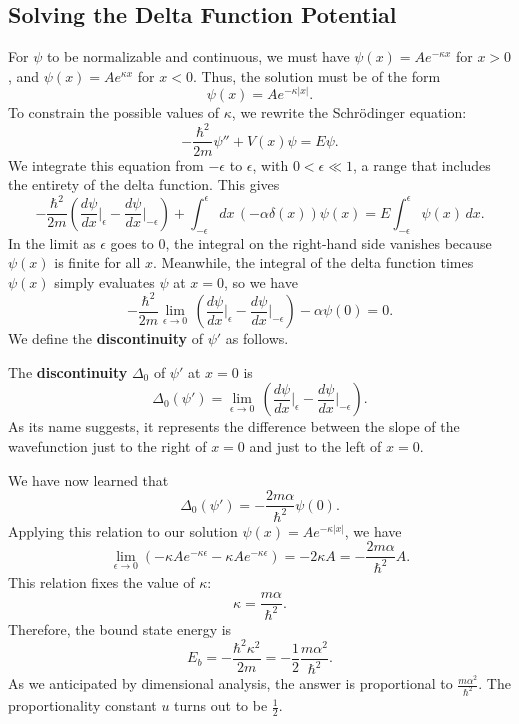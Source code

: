 \subsection{Solving the Delta Function Potential}\label{solving_the_delta_potential}

For $\psi$ to be normalizable and continuous, we must have $\psi(x)=Ae^{-\kappa x}$ for $x>0$, and $\psi(x)=Ae^{\kappa x}$ for $x<0$. Thus, the solution must be of the form $$\psi(x)=Ae^{-\kappa|x|}.$$To constrain the possible values of $\kappa$, we rewrite the Schrödinger equation: $$-\frac{\hbar^2}{2m}\psi''+V(x)\psi=E\psi.$$We integrate this equation from $-\epsilon$ to $\epsilon$, with $0<\epsilon\ll 1$, a range that includes the entirety of the delta function. This gives $$-\frac{\hbar^2}{2m}(\frac{d\psi}{dx}\bigg|_\epsilon-\frac{d\psi}{dx}\bigg|_{-\epsilon})+\int_{-\epsilon}^\epsilon dx\,(-\alpha\delta(x))\psi(x)=E\int_{-\epsilon}^\epsilon \psi(x)\,dx.$$In the limit as $\epsilon$ goes to $0$, the integral on the right-hand side vanishes because $\psi(x)$ is finite for all $x$. Meanwhile, the integral of the delta function times $\psi(x)$ simply evaluates $\psi$ at $x=0$, so we have $$-\frac{\hbar^2}{2m}\lim_{\epsilon\to 0}\,(\frac{d\psi}{dx}\bigg|_\epsilon-\frac{d\psi}{dx}\bigg|_{-\epsilon})-\alpha\psi(0)=0.$$We define the \textbf{discontinuity} of $\psi'$ as follows.

\begin{frameddefn}[Discontinuity]
    The \textbf{discontinuity} $\Delta_0$ of $\psi'$ at $x=0$ is $$\Delta_0(\psi')=\lim_{\epsilon\to 0}\,(\frac{d\psi}{dx}\bigg|_\epsilon-\frac{d\psi}{dx}\bigg|_{-\epsilon}).$$As its name suggests, it represents the difference between the slope of the wavefunction just to the right of $x=0$ and just to the left of $x=0$.
\end{frameddefn}

We have now learned that $$\Delta_0(\psi')=-\frac{2m\alpha}{\hbar^2}\psi(0).$$Applying this relation to our solution $\psi(x)=Ae^{-\kappa|x|}$, we have $$\lim_{\epsilon\to 0}(-\kappa Ae^{-\kappa\epsilon}-\kappa Ae^{-\kappa\epsilon})=-2\kappa A=-\frac{2m\alpha}{\hbar^2}A.$$This relation fixes the value of $\kappa$: $$\kappa=\frac{m\alpha}{\hbar^2}.$$Therefore, the bound state energy is $$\boxed{E_b=-\frac{\hbar^2\kappa^2}{2m}=-\frac{1}{2}\frac{m\alpha^2}{\hbar^2}}.$$As we anticipated by dimensional analysis, the answer is proportional to $\frac{m\alpha^2}{\hbar^2}$. The proportionality constant $u$ turns out to be $\frac{1}{2}$.